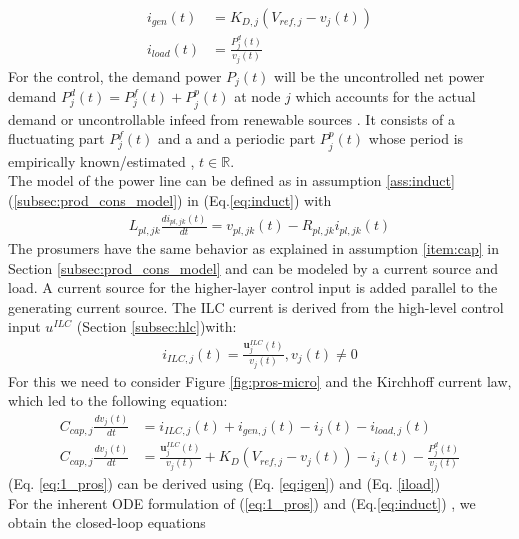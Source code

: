 \setlength{\abovedisplayshortskip}{0pt}
\setlength{\belowdisplayshortskip}{0pt}
\begin{align}
i_{gen}(t) &= K_{D,j}(V_{ref,j} - v_j(t)) \label{eq:igen}\\
i_{load}(t) &= \frac{P^d_j(t)}{v_j(t)} \label{iload}
\end{align}
For the control, the demand power $P_j(t)$ will be the uncontrolled net power demand $P_j^d(t) = P_j^f(t) + P_j^p(t)$ at node $j$ which
accounts for the actual demand or uncontrollable infeed
from renewable sources \cite{paperilc}. It consists of a fluctuating part $P_j^f(t)$ and a 
and a periodic part $P_j^p(t)$ whose period is empirically
known/estimated \cite{paperilc}, $t \in \mathbb{R}$. 
\\ The model of the power line can be defined as in assumption \ref{ass:induct} (\ref{subsec:prod_cons_model}) in (Eq.\ref{eq:induct}) with 
\begin{align*}
L_{pl,jk} \frac{di_{pl,jk}(t)}{dt} = v_{pl,jk}(t)-R_{pl,jk}i_{pl,jk}(t)
\end{align*}
The prosumers have the same behavior as explained in assumption \ref{item:cap} in Section \ref{subsec:prod_cons_model} and can be modeled by a current source and load. A current source for the higher-layer control input is added parallel to the generating current source. The ILC current is derived from the high-level control input $u^{ILC}$ (Section \ref{subsec:hlc})with:
\begin{align}
i_{ILC,j}(t) = \frac{\boldsymbol{u}^{ILC}_j(t)}{v_j(t)}, v_j(t)\neq 0
\end{align}  For this we need to consider Figure \ref{fig:pros-micro} and the Kirchhoff current law, which led to the following equation:
\begin{align}
C_{cap,j}\frac{dv_j(t)}{dt} &= i_{ILC,j}(t) + i_{gen,j}(t) - i_{j}(t) - i_{load,j}(t) \nonumber \\
C_{cap,j}\frac{dv_j(t)}{dt} &= \frac{\boldsymbol{u}^{ILC}_j(t)}{v_j(t)}+ K_{D}(V_{ref,j} - v_j(t)) - i_{j}(t) - \frac{P^d_j(t)}{v_j(t)} \label{eq:1_pros}
\end{align}
(Eq. \ref{eq:1_pros}) can be derived using (Eq. \ref{eq:igen}) and (Eq. \ref{iload})
\\For the inherent ODE formulation of (\ref{eq:1_pros}) and (Eq.\ref{eq:induct}) , we obtain the closed-loop equations


